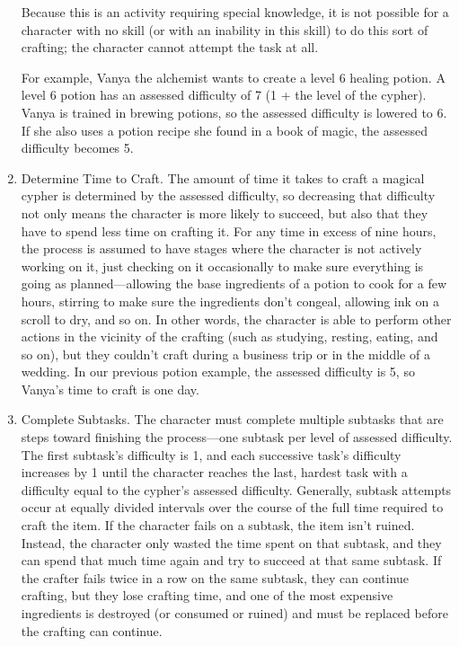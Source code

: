 \begin{multicols}{2}
\begin{enumerate}
Because this is an activity requiring special knowledge, it is not possible for a character with no skill (or with an inability in this skill) to do this sort of crafting; the character cannot attempt the task at all. 

For example, Vanya the alchemist wants to create a level 6 healing potion. A level 6 potion has an assessed difficulty of 7 (1 + the level of the cypher). Vanya is trained in brewing potions, so the assessed difficulty is lowered to 6. If she also uses a potion recipe she found in a book of magic, the assessed difficulty becomes 5.
\item Determine Time to Craft. The amount of time it takes to craft a magical cypher is determined by the assessed difficulty, so decreasing that difficulty not only means the character is more likely to succeed, but also that they have to spend less time on crafting it. For any time in excess of nine hours, the process is assumed to have stages where the character is not actively working on it, just checking on it occasionally to make sure everything is going as planned—allowing the base ingredients of a potion to cook for a few hours, stirring to make sure the ingredients don’t congeal, allowing ink on a scroll to dry, and so on. In other words, the character is able to perform other actions in the vicinity of the crafting (such as studying, resting, eating, and so on), but they couldn’t craft during a business trip or in the middle of a wedding. In our previous potion example, the assessed difficulty is 5, so Vanya’s time to craft is one day.
\item Complete Subtasks. The character must complete multiple subtasks that are steps toward finishing the process—one subtask per level of assessed difficulty.  The first subtask’s difficulty is 1, and each successive task’s difficulty increases by 1 until the character reaches the last, hardest task with a difficulty equal to the cypher’s assessed difficulty.  Generally, subtask attempts occur at equally divided intervals over the course of the full time required to craft the item.  If the character fails on a subtask, the item isn’t ruined. Instead, the character only wasted the time spent on that subtask, and they can spend that much time again and try to succeed at that same subtask. If the crafter fails twice in a row on the same subtask, they can continue crafting, but they lose crafting time, and one of the most expensive ingredients is destroyed (or consumed or ruined) and must be replaced before the crafting can continue. 
\end{enumerate}


\end{multicols}
